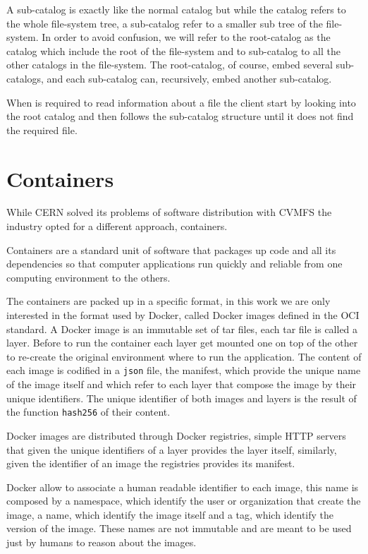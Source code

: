 A sub-catalog is exactly like the normal catalog but while the catalog refers
to the whole file-system tree, a sub-catalog refer to a smaller sub tree of the
file-system. In order to avoid confusion, we will refer to the root-catalog as
the catalog which include the root of the file-system and to sub-catalog to all
the other catalogs in the file-system. The root-catalog, of course, embed
several sub-catalogs, and each sub-catalog can, recursively, embed another
sub-catalog.

When is required to read information about a file the client start by looking
into the root catalog and then follows the sub-catalog structure until it does
not find the required file.

\section{Containers}

While CERN solved its problems of software distribution with CVMFS the industry
opted for a different approach, containers.

Containers are a standard unit of software that packages up code and all its
dependencies so that computer applications run quickly and reliable from one
computing environment to the others.

The containers are packed up in a specific format, in this work we are only
interested in the format used by Docker, called Docker images defined in the
OCI standard. A Docker image is an immutable set of tar files, each tar file is
called a layer. Before to run the container each layer get mounted one on top
of the other to re-create the original environment where to run the
application. The content of each image is codified in a \texttt{json} file, the
manifest, which provide the unique name of the image itself and which refer to
each layer that compose the image by their unique identifiers. The unique
identifier of both images and layers is the result of the function
\texttt{hash256} of their content.

Docker images are distributed through Docker registries, simple HTTP servers
that given the unique identifiers of a layer provides the layer itself,
similarly, given the identifier of an image the registries provides its
manifest.

Docker allow to associate a human readable identifier to each image, this name
is composed by a namespace, which identify the user or organization that create
the image, a name, which identify the image itself and a tag, which identify
the version of the image. These names are not immutable and are meant to be
used just by humans to reason about the images.

